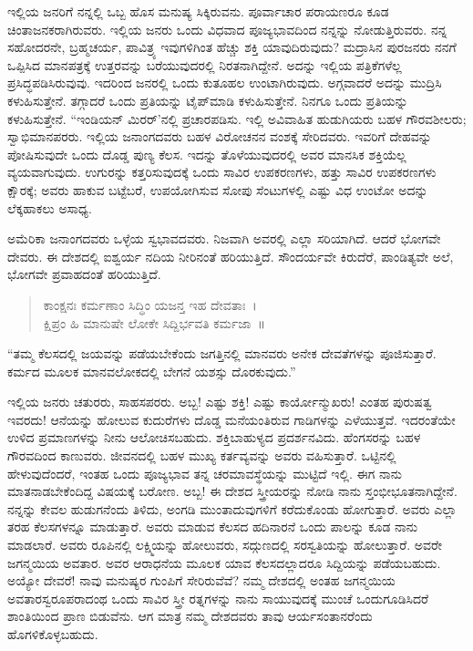 ಇಲ್ಲಿಯ ಜನರಿಗೆ ನನ್ನಲ್ಲಿ ಒಬ್ಬ ಹೊಸ ಮನುಷ್ಯ ಸಿಕ್ಕಿರುವನು. ಪೂರ್ವಾಚಾರ ಪರಾಯಣರೂ ಕೂಡ ಚಿಂತಾಜನಕರಾಗಿರುವರು. ಇಲ್ಲಿಯ ಜನರು ಒಂದು ವಿಧವಾದ ಪೂಜ್ಯಭಾವದಿಂದ ನನ್ನನ್ನು ನೋಡುತ್ತಿರುವರು. ನನ್ನ ಸಹೋದರನೇ, ಬ್ರಹ್ಮಚರ್ಯ, ಪಾವಿತ್ರ್ಯ ಇವುಗಳಿಗಿಂತ ಹೆಚ್ಚು ಶಕ್ತಿ ಯಾವುದಿರುವುದು? ಮದ್ರಾಸಿನ ಪುರಜನರು ನನಗೆ ಒಪ್ಪಿಸಿದ ಮಾನಪತ್ರಕ್ಕೆ ಉತ್ತರವನ್ನು ಬರೆಯುವುದರಲ್ಲಿ ನಿರತನಾಗಿದ್ದೇನೆ. ಅದನ್ನು ಇಲ್ಲಿಯ ಪತ್ರಿಕೆಗಳೆಲ್ಲ ಪ್ರಸಿದ್ಧಪಡಿಸಿರುವುವು. ಇದರಿಂದ ಜನರಲ್ಲಿ ಒಂದು ಕುತೂಹಲ ಉಂಟಾಗಿರುವುದು. ಅಗ್ಗವಾದರೆ ಅದನ್ನು ಮುದ್ರಿಸಿ ಕಳುಹಿಸುತ್ತೇನೆ. ತಗ್ಗಾದರೆ ಒಂದು ಪ್ರತಿಯನ್ನು ಟೈಪ್‌ಮಾಡಿ ಕಳುಹಿಸುತ್ತೇನೆ. ನಿನಗೂ ಒಂದು ಪ್ರತಿಯನ್ನು ಕಳುಹಿಸುತ್ತೇನೆ. “ಇಂಡಿಯನ್ ಮಿರರ್'ನಲ್ಲಿ ಪ್ರಚಾರಪಡಿಸು. ಇಲ್ಲಿ ಅವಿವಾಹಿತ ಹುಡುಗಿಯರು ಬಹಳ ಗೌರವಶೀಲರು; ಸ್ವಾಭಿಮಾನಪರರು. ಇಲ್ಲಿಯ ಜನಾಂಗದವರು ಬಹಳ ವಿರೋಚನನ ವಂಶಕ್ಕೆ ಸೇರಿದವರು. ಇವರಿಗೆ ದೇಹವನ್ನು ಪೋಷಿಸುವುದೇ ಒಂದು ದೊಡ್ಡ ಪುಣ್ಯ ಕೆಲಸ. ಇದನ್ನು ತೊಳೆಯುವುದರಲ್ಲಿ ಅವರ ಮಾನಸಿಕ ಶಕ್ತಿಯೆಲ್ಲ ವ್ಯಯವಾಗುವುದು. ಉಗುರನ್ನು ಕತ್ತರಿಸುವುದಕ್ಕೆ ಒಂದು ಸಾವಿರ ಉಪಕರಣಗಳು, ಹತ್ತು ಸಾವಿರ ಉಪಕರಣಗಳು ಕ್ಷೌರಕ್ಕೆ; ಅವರು ಹಾಕುವ ಬಟ್ಟೆಬರೆ, ಉಪಯೋಗಿಸುವ ಸೋಪು ಸೆಂಟುಗಳಲ್ಲಿ ಎಷ್ಟು ವಿಧ ಉಂಟೋ ಅದನ್ನು ಲೆಕ್ಕಹಾಕಲು ಅಸಾಧ್ಯ.

ಅಮೆರಿಕಾ ಜನಾಂಗದವರು ಒಳ್ಳೆಯ ಸ್ವಭಾವದವರು. ನಿಜವಾಗಿ ಅವರಲ್ಲಿ ಎಲ್ಲಾ ಸರಿಯಾಗಿದೆ. ಆದರೆ ಭೋಗವೇ ದೇವರು. ಈ ದೇಶದಲ್ಲಿ ಐಶ್ವರ್ಯ ನದಿಯ ನೀರಿನಂತೆ ಹರಿಯುತ್ತಿದೆ. ಸೌಂದರ್ಯವೇ ಕಿರುದೆರೆ, ಪಾಂಡಿತ್ಯವೇ ಅಲೆ, ಭೋಗವೇ ಪ್ರವಾಹದಂತೆ ಹರಿಯುತ್ತಿದೆ.

\begin{verse}
 ಕಾಂಕ್ಷನಃ ಕರ್ಮಣಾಂ ಸಿದ್ಧಿಂ ಯಜನ್ತ ಇಹ ದೇವತಾಃ~।\\
 ಕ್ಷಿಪ್ರಂ ಹಿ ಮಾನುಷೇ ಲೋಕೇ ಸಿದ್ದಿರ್ಭವತಿ ಕರ್ಮಜಾ~॥   
\end{verse}


“ತಮ್ಮ ಕೆಲಸದಲ್ಲಿ ಜಯವನ್ನು ಪಡೆಯಬೇಕೆಂದು ಜಗತ್ತಿನಲ್ಲಿ ಮಾನವರು ಅನೇಕ ದೇವತೆಗಳನ್ನು ಪೂಜಿಸುತ್ತಾರೆ. ಕರ್ಮದ ಮೂಲಕ ಮಾನವಲೋಕದಲ್ಲಿ ಬೇಗನೆ ಯಶಸ್ಸು ದೊರಕುವುದು.''

ಇಲ್ಲಿಯ ಜನರು ಚತುರರು, ಸಾಹಸಪರರು. ಅಬ್ಬ! ಎಷ್ಟು ಶಕ್ತಿ! ಎಷ್ಟು \break ಕಾರ್ಯೋನ್ಮುಖರು! ಎಂತಹ ಪುರುಷತ್ವ ಇವರದು! ಆನೆಯನ್ನು ಹೋಲುವ ಕುದುರೆಗಳು ದೊಡ್ಡ ಮನೆಯಂತಿರುವ ಗಾಡಿಗಳನ್ನು ಎಳೆಯುತ್ತವೆ. ಇದರಂತೆಯೇ ಉಳಿದ ಪ್ರಮಾಣಗಳನ್ನು ನೀನು ಆಲೋಚಿಸಬಹುದು. ಶಕ್ತಿಬಾಹುಳ್ಯದ ಪ್ರದರ್ಶನವಿದು. ಹೆಂಗಸರನ್ನು ಬಹಳ ಗೌರವದಿಂದ ಕಾಣುವರು. ಜೀವನದಲ್ಲಿ ಬಹಳ ಮುಖ್ಯ ಕರ್ತವ್ಯವನ್ನು ಅವರು ವಹಿಸುತ್ತಾರೆ. ಒಟ್ಟಿನಲ್ಲಿ ಹೇಳುವುದೆಂದರೆ, ಇಂತಹ ಒಂದು ಪೂಜ್ಯಭಾವ ತನ್ನ ಚರಮಾವಸ್ಥೆಯನ್ನು ಮುಟ್ಟಿದೆ ಇಲ್ಲಿ. ಈಗ ನಾನು ಮಾತನಾಡಬೇಕೆಂದಿದ್ದ ವಿಷಯಕ್ಕೆ ಬರೋಣ. ಅಬ್ಬ! ಈ ದೇಶದ ಸ್ತ್ರೀಯರನ್ನು ನೋಡಿ ನಾನು ಸ್ತಂಭೀಭೂತನಾಗಿದ್ದೇನೆ. ನನ್ನನ್ನು ಕೇವಲ ಹುಡುಗನೆಂದು ತಿಳಿದು, ಅಂಗಡಿ ಮುಂತಾದುವುಗಳಿಗೆ ಕರೆದುಕೊಂಡು ಹೋಗುತ್ತಾರೆ. ಅವರು ಎಲ್ಲಾ ತರಹ ಕೆಲಸಗಳನ್ನೂ ಮಾಡುತ್ತಾರೆ. ಅವರು ಮಾಡುವ ಕೆಲಸದ ಹದಿನಾರನೆ ಒಂದು ಪಾಲನ್ನು ಕೂಡ ನಾನು ಮಾಡಲಾರೆ. ಅವರು ರೂಪಿನಲ್ಲಿ ಲಕ್ಷ್ಮಿಯನ್ನು ಹೋಲುವರು, ಸದ್ಗುಣದಲ್ಲಿ ಸರಸ್ವತಿಯನ್ನು ಹೋಲುತ್ತಾರೆ. ಅವರೇ ಜಗನ್ಮಯಿಯ ಅವತಾರ. ಅವರ ಆರಾಧನೆಯ ಮೂಲಕ ಯಾವ ಕೆಲಸದಲ್ಲಾದರೂ ಸಿದ್ದಿಯನ್ನು ಪಡೆಯಬಹುದು. ಅಯ್ಯೋ ದೇವರೆ! ನಾವು ಮನುಷ್ಯರ ಗುಂಪಿಗೆ ಸೇರಿರುವೆವೆ? ನಮ್ಮ ದೇಶದಲ್ಲಿ ಅಂತಹ ಜಗನ್ಮಯಿಯ ಅವತಾರಸ್ವರೂಪರಾದಂಥ ಒಂದು ಸಾವಿರ ಸ್ತ್ರೀ ರತ್ನಗಳನ್ನು ನಾನು ಸಾಯುವುದಕ್ಕೆ ಮುಂಚೆ ಒಂದುಗೂಡಿಸಿದರೆ ಶಾಂತಿಯಿಂದ ಪ್ರಾಣ ಬಿಡುವೆನು. ಆಗ ಮಾತ್ರ ನಮ್ಮ ದೇಶದವರು ತಾವು ಆರ್ಯಸಂತಾನರೆಂದು ಹೊಗಳಿಕೊಳ್ಳಬಹುದು.

